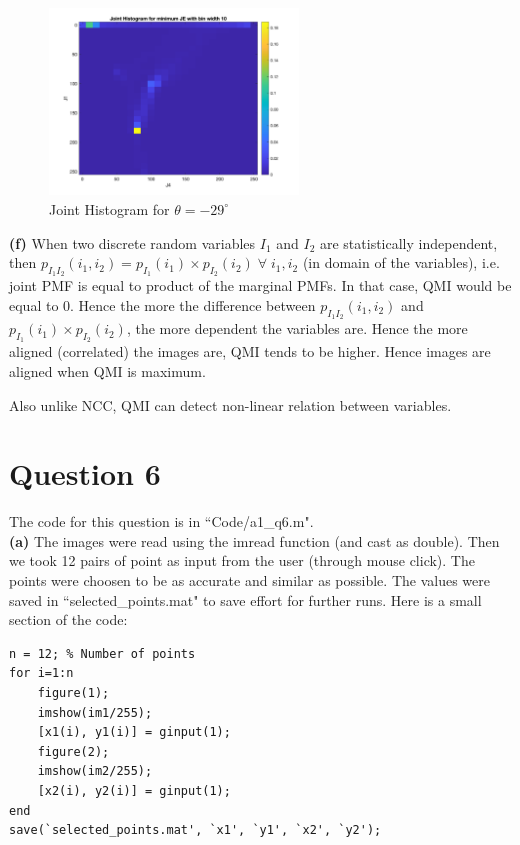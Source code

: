 \documentclass[12pt]{article}
\begin{document}
    \vspace{-13pt}
    
    \begin{figure}[H]
        \centering
        \includegraphics[width=0.59\textwidth]{Images/Q5/Joint_hist_JE.png}
        \vspace{-10pt}
        \caption{Joint Histogram for $\theta = -29^{\circ}$}
    \end{figure}
    
    \vspace{-10pt}

    \textbf{(f)} When two discrete random variables $I_1$ and $I_2$ are statistically independent, then $p_{I_1 I_2}(i_1,i_2)=p_{I_1}(i_1) \times p_{I_2}(i_2) \; \forall \; i_1, i_2$ (in domain of the variables), i.e. joint PMF is equal to product of the marginal PMFs. In that case, QMI would be equal to $0$. Hence the more the difference between $p_{I_1 I_2}(i_1,i_2)$ and $p_{I_1}(i_1) \times p_{I_2}(i_2)$, the more dependent the variables are. Hence the more aligned (correlated) the images are, QMI tends to be higher. Hence images are aligned when QMI is maximum.
    
    Also unlike NCC, QMI can detect non-linear relation between variables.
\clearpage
\section*{Question 6}
The code for this question is in ``Code/a1\_q6.m".\\
\textbf{(a)} The images were read using the imread function (and cast as double). Then we took 12 pairs of point as input from the user (through mouse click). The points were choosen to be as accurate and similar as possible. The values were saved in ``selected\_points.mat" to save effort for further runs. Here is a small section of the code:
\begin{verbatim}
n = 12; % Number of points
for i=1:n
    figure(1); 
    imshow(im1/255); 
    [x1(i), y1(i)] = ginput(1);
    figure(2); 
    imshow(im2/255); 
    [x2(i), y2(i)] = ginput(1);
end
save(`selected_points.mat', `x1', `y1', `x2', `y2');
\end{verbatim}
\end{document}
